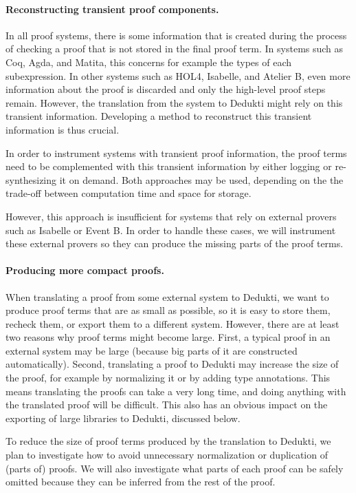 \paragraph*{Reconstructing transient proof components.}
In all proof systems, there is some information that is created during
the process of checking a proof that is not stored in the final proof
term. In systems such as Coq, Agda, and Matita, this concerns for
example the types of each subexpression. In other systems such as
HOL4, Isabelle, and Atelier B, even more information about the proof
is discarded and only the high-level proof steps remain.  However, the
translation from the system to Dedukti might rely on this transient
information. Developing a method to reconstruct this transient
information is thus crucial.

In order to instrument systems with transient proof information, the
proof terms need to be complemented with this transient information by
either logging or re-synthesizing it on demand. Both approaches may be
used, depending on the the trade-off between computation time and space
for storage.

However, this approach is insufficient for systems that rely on
external provers such as Isabelle or Event B. In order to handle these
cases, we will instrument these external provers so they can produce
the missing parts of the proof terms.

\paragraph*{Producing more compact proofs.}
When translating a proof from some external system to Dedukti, we want
to produce proof terms that are as small as possible, so it is easy to
store them, recheck them, or export them to a different
system. However, there are at least two reasons why proof terms might
become large. First, a typical proof in an external system may be large
(because big parts of it are constructed automatically). Second,
translating a proof to Dedukti may increase the size of the proof, for
example by normalizing it or by adding type annotations.  This means
translating the proofs can take a very long time, and doing anything
with the translated proof will be difficult. This also has an obvious
impact on the exporting of large libraries to Dedukti, discussed
below.

To reduce the size of proof terms produced by the translation to
Dedukti, we plan to investigate how to avoid unnecessary
normalization or duplication of (parts of) proofs. We will also
investigate what parts of each proof can be safely omitted because
they can be inferred from the rest of the proof.

